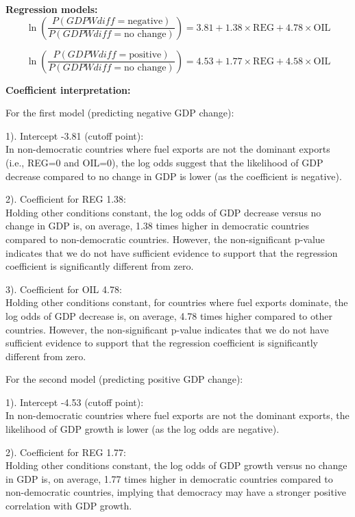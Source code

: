 \documentclass[12pt,a4paper]{article}
\begin{document}
\begin{enumerate}
	\noindent \textbf{Regression models:}
  \[
  \ln\left(\frac{{P(GDPWdiff = \text{negative})}}{{P(GDPWdiff = \text{no change})}}\right) = 3.81 + 1.38 \times \text{REG} + 4.78 \times \text{OIL}
  \]
  
      \[
  \ln\left(\frac{{P(GDPWdiff = \text{positive})}}{{P(GDPWdiff = \text{no change})}}\right) = 4.53 + 1.77 \times \text{REG} + 4.58 \times \text{OIL}
  \]

	\noindent \textbf{Coefficient interpretation:}
	
	\vspace{.25cm}
For the first model (predicting negative GDP change):

1). Intercept -3.81 (cutoff point): 
\\In non-democratic countries where fuel exports are not the dominant exports (i.e., REG=0 and OIL=0), the log odds suggest that the likelihood of GDP decrease compared to no change in GDP is lower (as the coefficient is negative).

2). Coefficient for REG 1.38: 
\\Holding other conditions constant, the log odds of GDP decrease versus no change in GDP is, on average, 1.38 times higher in democratic countries compared to non-democratic countries. However, the non-significant p-value indicates that we do not have sufficient evidence to support that the regression coefficient is significantly different from zero.

3). Coefficient for OIL 4.78: 
\\Holding other conditions constant, for countries where fuel exports dominate, the log odds of GDP decrease is, on average, 4.78 times higher compared to other countries. However, the non-significant p-value indicates that we do not have sufficient evidence to support that the regression coefficient is significantly different from zero.


\vspace{.25cm}
For the second model (predicting positive GDP change):

1). Intercept -4.53 (cutoff point): 
\\In non-democratic countries where fuel exports are not the dominant exports, the likelihood of GDP growth is lower (as the log odds are negative).

2). Coefficient for REG 1.77: 
\\Holding other conditions constant, the log odds of GDP growth versus no change in GDP is, on average, 1.77 times higher in democratic countries compared to non-democratic countries, implying that democracy may have a stronger positive correlation with GDP growth.


\end{enumerate}
\end{document}
